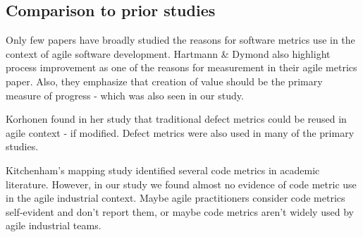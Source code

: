 \documentclass{sig-alternate}
\newcommand{\juha}[1]{\ignorespaces}
\begin{document}



\subsection{Comparison to prior studies}%
Only few papers have broadly studied the reasons for software metrics use in
the context of agile software development. Hartmann \& Dymond \cite{1667571}
also highlight process improvement as one of the reasons for measurement in
their agile metrics paper. Also, they emphasize that creation of value should
be the primary measure of progress - which was also seen in our study.

Korhonen \cite{Korhonen2009} found in her study that traditional defect
metrics could be reused in agile context - if modified. Defect metrics were
also used in many of the primary studies.

Kitchenham's mapping study \cite{kitchenham_whats_2010} identified several
code metrics in academic literature. However, in our study we found almost no
evidence of code metric use in the agile industrial context. Maybe agile
practitioners consider code metrics self-evident and don't report them, or
maybe code metrics aren't widely used by agile industrial teams.



\end{document}
